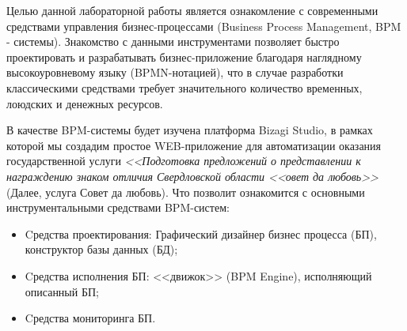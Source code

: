 \Introduction

Целью данной лабораторной работы является ознакомление с современными средствами
управления бизнес-процессами (Business Process Management, BPM - системы).
Знакомство с данными инструментами позволяет быстро проектировать и разрабатывать
бизнес-приложение благодаря наглядному высокоуровневому языку (BPMN-нотацией), что
в случае разработки классическими средствами требует значительного
количество временных, лоюдских и денежных ресурсов.

В качестве BPM-системы будет изучена платформа Bizagi Studio, в рамках которой
мы создадим простое WEB-приложение для автоматизации оказания государственной
услуги \textit{<<Подготовка предложений о представле­нии к награждению знаком
отличия Свердловской области <<овет да любовь>>}(Далее, услуга Совет да любовь).
Что позволит ознакомится с основными инструментальными средствами BPM-систем:

\begin{itemize}
    \item Cредства проектирования: Графический дизайнер бизнес процесса (БП),
    конструктор базы данных (БД);
    \item Cредства исполнения БП: <<движок>> (BPM Engine),
    исполняющий описанный БП;
    \item Cредства мониторинга БП.
\end{itemize}
